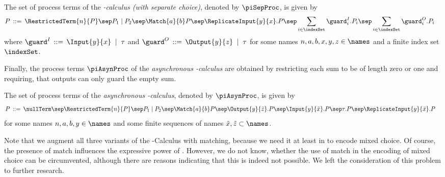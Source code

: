 \documentclass[]{llncs}
\begin{document}
\begin{definition}[\piSep]
  The set of process terms of the \emph{\piCal-calculus (with separate choice)}, denoted by $ \piSepProc $, is given by
	\begin{align*}
		P & \;\mathop{::=}\;
                \RestrictedTerm{n}{P}
                \sep P_1 \mid P_2
                \sep \Match{a}{b}P
                \sep \ReplicateInput{y}{x}.P
                \sep \sum_{i \in \indexSet} \guard^I_i.P_i
                \sep \sum_{i \in \indexSet} \guard^O_i.P_i
	\end{align*}
	where $ \guard^I \;\mathop{::=}\; \Input{y}{x} \; \mid \; \tau $ and $ \guard^O \;\mathop{::=}\; \Output{y}{z} \; \mid \; \tau $ for some names $ n, a, b, x, y, z \in \names $ and a finite index set $ \indexSet $.
\end{definition}

Finally, the process terms $ \piAsynProc $ of the \emph{asynchronous \piCal-calculus} \piAsyn \cite{boudol92,hondaTokoro91} are obtained by restricting each sum to be of length zero or one and requiring, that outputs can only guard the empty sum.
 
\begin{definition}[\piAsyn]
  The set of process terms of the \emph{asynchronous \piCal-calculus}, denoted by $ \piAsynProc $, is given by
	\begin{align*}
		P & \;\mathop{::=}\;
				\nullTerm
                \sep \RestrictedTerm{n}{P}
                \sep P_1 \mid P_2
                \sep \Match{a}{b}P
                \sep \Output{y}{\tilde{z}}.P
                \sep \Input{y}{\tilde{x}}.P
                \sep \tau.P
                \sep \ReplicateInput{y}{\tilde{x}}.P
	\end{align*}
	for some names $ n, a, b, y \in \names $ and some finite sequences of names $ \tilde{x}, \tilde{z} \subset \names $.
\end{definition}

Note that we augment all three variants of the \piCal-Calculus with matching, because we need it at least in \piAsyn to encode mixed choice. Of course, the presence of match influences the expressive power of \piAsyn. However, we do not know, whether the use of match in the encoding of mixed choice can be circumvented, although there are reasons indicating that this is indeed not possible. We left the consideration of this problem to further research.
\end{document}
